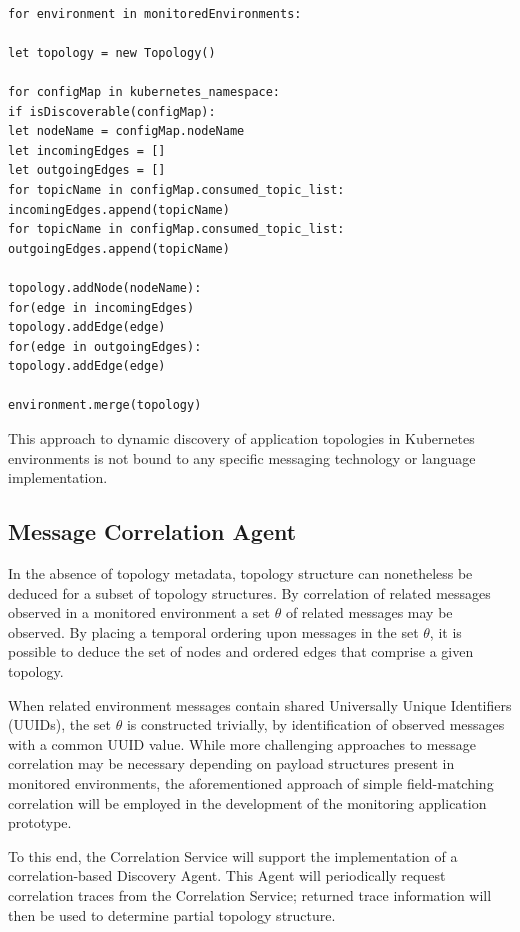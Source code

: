 \vspace{5mm}

\begin{lstlisting}[caption={Kubernetes/Kafka Discovery Agent Algorithm},captionpos=b,label={k8s_kafka_agent_pseudeocode}]

for environment in monitoredEnvironments:

let topology = new Topology()

for configMap in kubernetes_namespace:
if isDiscoverable(configMap):
let nodeName = configMap.nodeName
let incomingEdges = []
let outgoingEdges = []
for topicName in configMap.consumed_topic_list:
incomingEdges.append(topicName)
for topicName in configMap.consumed_topic_list:
outgoingEdges.append(topicName)

topology.addNode(nodeName):
for(edge in incomingEdges)
topology.addEdge(edge)
for(edge in outgoingEdges):
topology.addEdge(edge)	

environment.merge(topology)
\end{lstlisting}

This approach to dynamic discovery of application topologies in Kubernetes environments  is not bound to any specific messaging technology or language implementation.

\subsection{Message Correlation Agent}\label{design_message_correlation}

In the absence of topology metadata, topology structure can nonetheless be deduced for a subset of topology structures. By correlation of related messages observed in a monitored environment a set $\theta$ of related messages may be observed. By placing a temporal ordering upon messages in the set $\theta$, it is possible to deduce the set of nodes and ordered edges that comprise a given topology. 

When related environment messages contain shared Universally Unique Identifiers (UUIDs), the set  $\theta$ is constructed trivially, by identification of observed messages with a common UUID value. While more challenging approaches to message correlation may be necessary depending on payload structures present in monitored environments, the aforementioned approach of simple field-matching correlation will be employed in the development of the monitoring application prototype.

To this end, the Correlation Service will support the implementation of a correlation-based Discovery Agent. This Agent will periodically request correlation traces from the Correlation Service; returned trace information will then be used to determine partial topology structure. 

